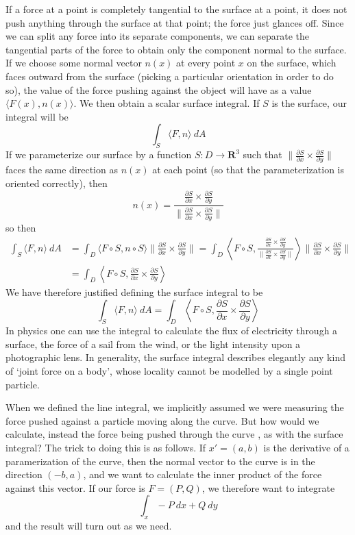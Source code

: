 \documentclass[12pt]{amsbook}
\theoremstyle{plain}
\theoremstyle{definition}
\begin{document}
If a force at a point is completely tangential to the surface at a point, it does not push anything through the surface at that point; the force just glances off. Since we can split any force into its separate components, we can separate the tangential parts of the force to obtain only the component normal to the surface. If we choose some normal vector $n(x)$ at every point $x$ on the surface, which faces outward from the surface (picking a particular orientation in order to do so), the value of the force pushing against the object will have as a value $\langle F(x), n(x) \rangle$. We then obtain a scalar surface integral. If $S$ is the surface, our integral will be
%
\[ \int_S \langle F, n \rangle\ dA \]
%
If we parameterize our surface by a function $S:D \to \mathbf{R}^3$ such that $\| \frac{\partial S}{\partial x} \times \frac{\partial S}{\partial y} \|$ faces the same direction as $n(x)$ at each point (so that the parameterization is oriented correctly), then
%
\[ n(x) = \frac{\frac{\partial S}{\partial x} \times \frac{\partial S}{\partial y}}{\| \frac{\partial S}{\partial x} \times \frac{\partial S}{\partial y} \|} \]
%
so then
%
\begin{align*}
    \int_S \langle F, n \rangle\ dA &= \int_D \langle F \circ S, n \circ S \rangle \bigg\| \frac{\partial S}{\partial x} \times \frac{\partial S}{\partial y} \bigg\| = \int_D \left\langle F \circ S, \frac{\frac{\partial S}{\partial x} \times \frac{\partial S}{\partial y}}{\| \frac{\partial S}{\partial x} \times \frac{\partial S}{\partial y} \|} \right\rangle \bigg\| \frac{\partial S}{\partial x} \times \frac{\partial S}{\partial y} \bigg\|\\
    &= \int_D \left\langle F \circ S, \frac{\partial S}{\partial x} \times \frac{\partial S}{\partial y} \right\rangle
\end{align*}
%
We have therefore justified defining the surface integral to be
%
\[ \int_S \langle F, n \rangle\ dA = \int_D \left\langle F \circ S, \frac{\partial S}{\partial x} \times \frac{\partial S}{\partial y} \right\rangle \]
%
In physics one can use the integral to calculate the flux of electricity through a surface, the force of a sail from the wind, or the light intensity upon a photographic lens. In generality, the surface integral describes elegantly any kind of `joint force on a body', whose locality cannot be modelled by a single point particle.

When we defined the line integral, we implicitly assumed we were measuring the force pushed against a particle moving along the curve. But how would we calculate, instead the force being pushed through the curve , as with the surface integral? The trick to doing this is as follows. If $x' = (a,b)$ is the derivative of a paramerization of the curve, then the normal vector to the curve is in the direction $(-b,a)$, and we want to calculate the inner product of the force against this vector. If our force is $F = (P,Q)$, we therefore want to integrate
%
\[ \int_x -P\ dx + Q\ dy \]
%
and the result will turn out as we need.
\end{document}
